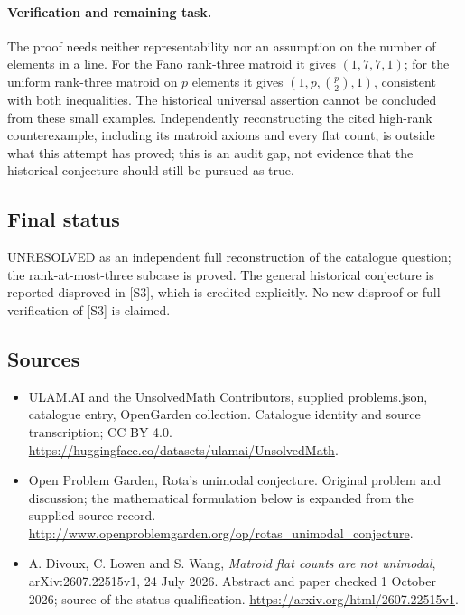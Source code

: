 \documentclass[11pt,a4paper]{article}
\begin{document}
\paragraph{Verification and remaining task.}
The proof needs neither representability nor an assumption on the
number of elements in a line. For the Fano rank-three matroid it gives
$(1,7,7,1)$; for the uniform rank-three matroid on $p$ elements it
gives $(1,p,\binom p2,1)$, consistent with both inequalities. The
historical universal assertion cannot be concluded from these small
examples. Independently reconstructing the cited high-rank counterexample,
including its matroid axioms and every flat count, is outside what this
attempt has proved; this is an audit gap, not evidence that the
historical conjecture should still be pursued as true.

\subsection{Final status}
UNRESOLVED as an independent full reconstruction of the catalogue
question; the rank-at-most-three subcase is proved. The general
historical conjecture is reported disproved in [S3], which is credited
explicitly. No new disproof or full verification of [S3] is claimed.

\subsection{Sources}
\begin{itemize}
\item[S1] ULAM.AI and the UnsolvedMath Contributors, supplied problems.json, catalogue entry, OpenGarden collection. Catalogue identity and source transcription; CC BY 4.0.
\url{https://huggingface.co/datasets/ulamai/UnsolvedMath}.
\item[S2] Open Problem Garden, Rota's unimodal conjecture. Original problem and discussion; the mathematical formulation below is expanded from the supplied source record.
\url{http://www.openproblemgarden.org/op/rotas_unimodal_conjecture}.
\item[S3] A. Divoux, C. Lowen and S. Wang, \emph{Matroid flat counts are not unimodal}, arXiv:2607.22515v1, 24 July 2026. Abstract and paper checked 1 October 2026; source of the status qualification.
\url{https://arxiv.org/html/2607.22515v1}.
\end{itemize}
\end{document}

